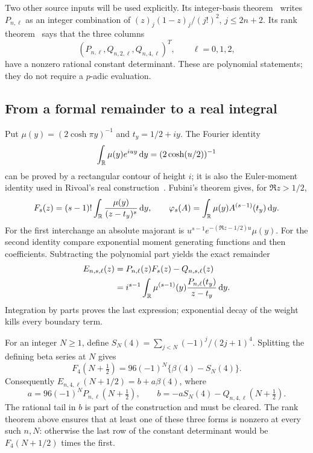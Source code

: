 Two other source inputs will be used explicitly. Its integer-basis
theorem~\cite[Theorem 8.1]{KP} writes $P_{n,\ell}$ as an integer
combination of $(z)_j(1-z)_j/(j!)^2$, $j\le2n+2$. Its rank
theorem~\cite[Theorem 7.1]{KP} says that the three columns
\[
       (P_{n,\ell},Q_{n,2,\ell},Q_{n,4,\ell})^T,
                       \qquad \ell=0,1,2,
\]
have a nonzero rational constant determinant. These are polynomial
statements; they do not require a $p$-adic evaluation.

\subsection{From a formal remainder to a real integral}
Put $\mu(y)=(2\cosh\pi y)^{-1}$ and $t_y=1/2+iy$. The Fourier
identity
\[
 \int_\mathbb R\mu(y)e^{iuy}\,\mathrm d y=(2\cosh(u/2))^{-1}
\]
can be proved by a rectangular contour of height $i$; it is also the
Euler-moment identity used in Rivoal's real construction~\cite{Rivoal06}.
Fubini's theorem gives, for $\Re z>1/2$,
\[
 F_s(z)=(s-1)!\int_\mathbb R\frac{\mu(y)}{(z-t_y)^s}\,\mathrm d y,
 \qquad
 \varphi_s(A)=\int_\mathbb R\mu(y)A^{(s-1)}(t_y)\,\mathrm d y.
\]
For the first interchange an absolute majorant is
$u^{s-1}e^{-(\Re z-1/2)u}\mu(y)$. For the second identity compare
exponential moment generating functions and then coefficients.
Subtracting the polynomial part yields the exact remainder
\begin{align}
 E_{n,s,\ell}(z)&=P_{n,\ell}(z)F_s(z)-Q_{n,s,\ell}(z)\notag\\
 &=i^{s-1}\int_\mathbb R\mu^{(s-1)}(y)
                    \frac{P_{n,\ell}(t_y)}{z-t_y}\,\mathrm d y.\label{eq:cauchy-remainder}
\end{align}
Integration by parts proves the last expression; exponential decay
of the weight kills every boundary term.

For an integer $N\ge1$, define $S_N(4)=\sum_{j<N}(-1)^j/(2j+1)^4$.
Splitting the defining beta series at $N$ gives
\[
 F_4(N+\tfrac12)=96(-1)^N\{\beta(4)-S_N(4)\}.
\]
Consequently $E_{n,4,\ell}(N+1/2)=b+a\beta(4)$, where
\begin{equation}\label{eq:pade-coefficients}
 a=96(-1)^NP_{n,\ell}(N+\tfrac12),\qquad
 b=-aS_N(4)-Q_{n,4,\ell}(N+\tfrac12).
\end{equation}
The rational tail in $b$ is part of the construction and must be cleared.
The rank theorem above ensures that at least one of these three forms
is nonzero at every such $n,N$: otherwise the last row of the constant
determinant would be $F_4(N+1/2)$ times the first.

